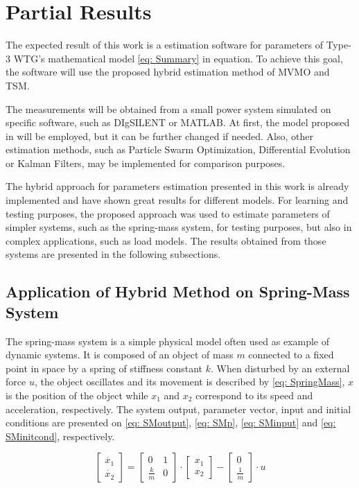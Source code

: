 \chapter{Partial Results}

\label{ch: Res}

The expected result of this work is a estimation software for parameters of Type-3 WTG's mathematical model \eqref{eq: Summary} in equation. To achieve this goal, the software will use the proposed hybrid estimation method of MVMO and TSM.

The measurements will be obtained from a small power system simulated on specific software, such as DIgSILENT or MATLAB. At first, the model proposed in \cite{Erlich2012} will be employed, but it can be further changed if needed. Also, other estimation methods, such as Particle Swarm Optimization, Differential Evolution or Kalman Filters, may be implemented for comparison purposes.

The hybrid approach for parameters estimation presented in this work is already implemented and have shown great results for different models. For learning and testing purposes, the proposed approach was used to estimate parameters of simpler systems, such as the spring-mass system, for testing purposes, but also in complex applications, such as load models. The results obtained from those systems are presented in the following subsections.

\section{Application of Hybrid Method on Spring-Mass System}

The spring-mass system is a simple physical model often used as example of dynamic systems. It is composed of an object of mass $m$ connected to a fixed point in space by a spring of stiffness constant $k$. When disturbed by an external force $u$, the object oscillates and its movement is described by \eqref{eq: SpringMass}, $x$ is the position of the object while $x_{1}$ and $x_{2}$ correspond to its speed and acceleration, respectively. The system output, parameter vector, input and initial conditions are presented on \eqref{eq: SMoutput}, \eqref{eq: SMp}, \eqref{eq: SMinput} and \eqref{eq: SMinitcond}, respectively.

\begin{equation}
	\begin{bmatrix}
		\dot{x_{1}} \\
		\dot{x_{2}}
	\end{bmatrix} = 
	\begin{bmatrix}
		0 & 1 \\
		\frac{k}{m} & 0
	\end{bmatrix}\cdot
	\begin{bmatrix}
		x_{1} \\
		x_{2}
	\end{bmatrix} -
	\begin{bmatrix}
		0 \\
		\frac{1}{m}
	\end{bmatrix}
	\cdot
	u
	\label{eq: SpringMass}
\end{equation}


